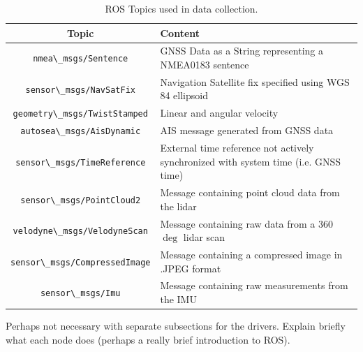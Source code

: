 \begin{table}[H]
	\centering
	\begin{tabularx}{\linewidth}{|c|L|}\hline
		\textbf{Topic} & \textbf{Content} \\\hline
		\lstinline[basicstyle=\ttfamily]{nmea\_msgs/Sentence} & GNSS Data as a String representing a NMEA0183 sentence \\\hline
		\lstinline[basicstyle=\ttfamily]{sensor\_msgs/NavSatFix} & Navigation Satellite fix specified using WGS 84 ellipsoid\\\hline
		\lstinline[basicstyle=\ttfamily]{geometry\_msgs/TwistStamped} & Linear and angular velocity\\\hline
		\lstinline[basicstyle=\ttfamily]{autosea\_msgs/AisDynamic} & AIS message generated from GNSS data\\\hline
		\lstinline[basicstyle=\ttfamily]{sensor\_msgs/TimeReference} & External time reference not actively synchronized with system time (i.e. GNSS time) \\\hline
		\lstinline[basicstyle=\ttfamily]{sensor\_msgs/PointCloud2} & Message containing point cloud data from the lidar \\\hline
		\lstinline[basicstyle=\ttfamily]{velodyne\_msgs/VelodyneScan} & Message containing raw data from a 360$\deg$ lidar scan \\\hline
		\lstinline[basicstyle=\ttfamily]{sensor\_msgs/CompressedImage} & Message containing a compressed image in .JPEG format\\\hline
		\lstinline[basicstyle=\ttfamily]{sensor\_msgs/Imu} & Message containing raw measurements from the IMU\\\hline
		\end{tabularx}
	\caption{ROS Topics used in data collection.}
	\label{tab:topics}
\end{table}

Perhaps not necessary with separate subsections for the drivers. Explain briefly what each node does (perhaps a really brief introduction to ROS).
